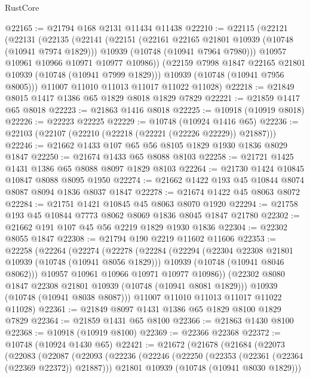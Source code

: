 \begin{lexlean}{RustCore}
\begin{coremodule}
@22165 := @21794 @168 @2131 @11434 @11438
@22210 := @22115
    (@22121
      (@22131
        (@22135
          (@22141
            (@22151
              (@22161 @22165 @21801 @10939 (@10748 (@10941 @7974 @1829)))
              @10939
              (@10748 (@10941 @7964 @7980)))
            @10957
            @10961
            @10966
            @10971
            @10977
            @10986))
        (@22159 @7998 @1847 @22165 @21801 @10939 (@10748 (@10941 @7999 @1829)))
        @10939
        (@10748 (@10941 @7956 @8005)))
      @11007
      @11010
      @11013
      @11017
      @11022
      @11028)
@22218 := @21849 @8015 @1417 @1386 @65 @1829 @8018 @1829 @7829
@22221 := @21859 @1417 @65 @8018
@22223 := @21863 @1416 @8018
@22225 := @10918 (@10919 @8018)
@22226 := @22223 @22225
@22229 := @10748 (@10924 @1416 @65)
@22236 := @22103 (@22107 (@22210 (@22218 (@22221 (@22226 @22229)) @21887)))
@22246 := @21662 @1433 @107 @65 @56 @8105 @1829 @1930 @1836 @8029 @1847
@22250 := @21674 @1433 @65 @8088 @8103
@22258 := @21721 @1425 @1431 @1386 @65 @8088 @8097 @1829 @8103
@22264 := @21730 @1424 @10845 @10847 @8088 @8095 @1950
@22274 := @21662 @1422 @193 @45 @10844 @8074 @8087 @8094 @1836 @8037 @1847
@22278 := @21674 @1422 @45 @8063 @8072
@22284 := @21751 @1421 @10845 @45 @8063 @8070 @1920
@22294 := @21758 @193 @45 @10844 @7773 @8062 @8069 @1836 @8045 @1847 @21780
@22302 := @21662 @191 @107 @45 @56 @2219 @1829 @1930 @1836
@22304 := @22302 @8055 @1847
@22308 := @21794 @190 @2219 @11602 @11606
@22353 := @22258
    (@22264
      (@22274
        (@22278
          (@22284
            (@22294
              (@22304 @22308 @21801 @10939 (@10748 (@10941 @8056 @1829)))
              @10939
              (@10748 (@10941 @8046 @8062)))
            @10957
            @10961
            @10966
            @10971
            @10977
            @10986))
        (@22302 @8080 @1847 @22308 @21801 @10939 (@10748 (@10941 @8081 @1829)))
        @10939
        (@10748 (@10941 @8038 @8087)))
      @11007
      @11010
      @11013
      @11017
      @11022
      @11028)
@22361 := @21849 @8097 @1431 @1386 @65 @1829 @8100 @1829 @7829
@22364 := @21859 @1431 @65 @8100
@22366 := @21863 @1430 @8100
@22368 := @10918 (@10919 @8100)
@22369 := @22366 @22368
@22372 := @10748 (@10924 @1430 @65)
@22421 := @21672
    (@21678
      (@21684
        (@22073
          (@22083
            (@22087
              (@22093
                (@22236
                  (@22246
                    (@22250 (@22353 (@22361 (@22364 (@22369 @22372)) @21887)))
                    @21801
                    @10939
                    (@10748 (@10941 @8030 @1829)))

\end{coremodule}
\end{lexlean}
